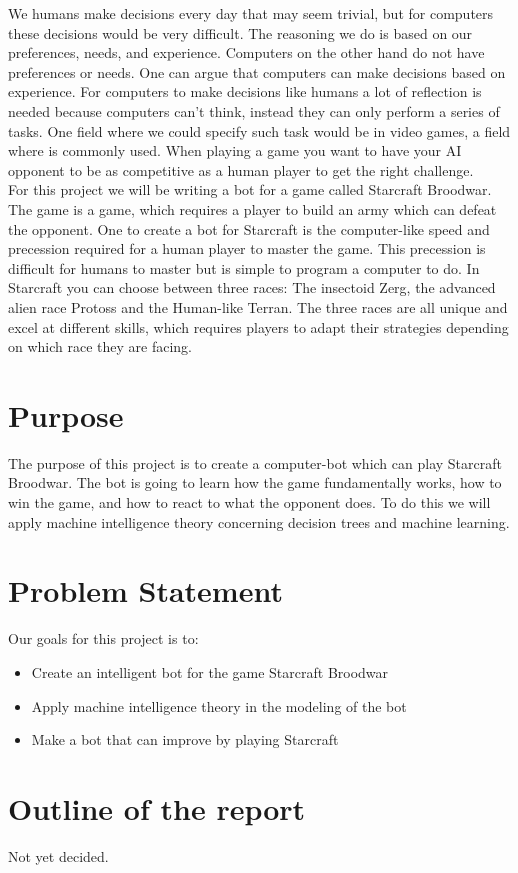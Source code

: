 	We humans make decisions every day that may seem trivial, but for computers these decisions would be very difficult. The reasoning we do 
	is based on our preferences, needs, and experience. Computers on the other hand do not have preferences or needs. One can argue that computers can
	make decisions based on experience.
	For computers to make decisions like humans a lot of reflection is needed because computers can't think, instead they can only perform a series of tasks.
	One field where we could specify such task would be in video games, a field where \abai is commonly used. When playing 
	a game you want to have your AI opponent to be as competitive as a human player to get the right challenge. \\
	
	For this project we will be writing a bot for a game called Starcraft Broodwar. The game is a \abrts game, which requires a player to build an army 
	which can defeat the opponent. One to create a bot for Starcraft is the computer-like speed and precession required for a human player to master the game. 
	This precession is difficult for humans to master but is simple to program a computer to do.
	In Starcraft you can choose between three races: The insectoid Zerg, the advanced alien race Protoss and the Human-like Terran. 
	The three races are all unique and excel at different skills, which requires players to adapt their strategies depending on which race they are facing.


\section{Purpose}
	The purpose of this project is to create a computer-bot which can play Starcraft Broodwar. 
	The bot is going to learn how the game fundamentally works, 
	how to win the game, and how to react to what the opponent does. 
	To do this we will apply machine intelligence theory concerning decision trees and machine learning.


\section{Problem Statement}
	Our goals for this project is to:
	\begin{itemize}
		\item Create an intelligent bot for the game Starcraft Broodwar
		\item Apply machine intelligence theory in the modeling of the bot
		\item Make a bot that can improve by playing Starcraft
	\end{itemize}

\section{Outline of the report}
	Not yet decided.
